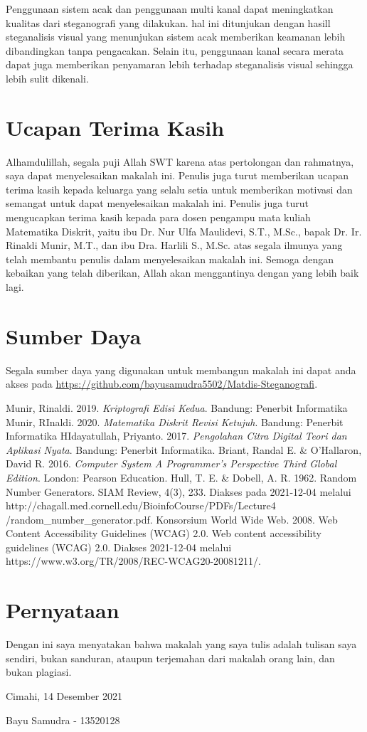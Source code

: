 \documentclass[10pt,conference]{IEEEtran}
\theoremstyle{definition}
\begin{document}
Penggunaan sistem acak dan penggunaan multi kanal dapat meningkatkan kualitas dari steganografi yang dilakukan. hal ini ditunjukan dengan hasill steganalisis visual yang menunjukan sistem acak memberikan keamanan lebih
dibandingkan tanpa pengacakan. Selain itu, penggunaan kanal secara merata dapat juga memberikan penyamaran lebih terhadap steganalisis visual sehingga lebih sulit dikenali.

\section*{Ucapan Terima Kasih}
Alhamdulillah, segala puji Allah SWT karena atas pertolongan dan rahmatnya, saya dapat menyelesaikan makalah ini. Penulis juga turut memberikan ucapan terima kasih kepada keluarga yang selalu setia untuk
memberikan motivasi dan semangat untuk dapat menyelesaikan makalah ini. Penulis juga turut mengucapkan terima kasih kepada para dosen pengampu mata kuliah Matematika Diskrit, yaitu ibu Dr. Nur Ulfa Maulidevi, S.T., M.Sc., bapak Dr. Ir.
Rinaldi Munir, M.T., dan ibu Dra. Harlili S., M.Sc. atas segala ilmunya yang telah membantu penulis dalam menyelesaikan makalah ini. Semoga dengan kebaikan yang telah diberikan, Allah akan menggantinya dengan yang lebih baik lagi.

\section*{Sumber Daya}
Segala sumber daya yang digunakan untuk membangun makalah ini dapat anda akses pada \url{https://github.com/bayusamudra5502/Matdis-Steganografi}.

\begin{thebibliography}{00}
 Munir, Rinaldi. 2019. \emph{Kriptografi Edisi Kedua}. Bandung: Penerbit Informatika 
 Munir, RInaldi. 2020. \emph{Matematika Diskrit Revisi Ketujuh}. Bandung: Penerbit Informatika
 HIdayatullah, Priyanto. 2017. \emph{Pengolahan Citra Digital Teori dan Aplikasi Nyata}. Bandung: Penerbit Informatika.
 Briant, Randal E. \& O'Hallaron, David R. 2016. \emph{Computer System A Programmer's Perspective Third Global Edition}. London: Pearson Education.
 Hull, T. E. \& Dobell, A. R. 1962. Random Number Generators. SIAM Review, 4(3), 233. Diakses pada 2021-12-04 melalui http://chagall.med.cornell.edu/BioinfoCourse/PDFs/Lecture4\\
/random\_number\_generator.pdf.
 Konsorsium World Wide Web. 2008. Web Content Accessibility Guidelines (WCAG) 2.0. Web content accessibility guidelines (WCAG) 2.0. Diakses 2021-12-04 melalui https://www.w3.org/TR/2008/REC-WCAG20-20081211/. 
\end{thebibliography}

\section*{Pernyataan}
Dengan ini saya menyatakan bahwa makalah yang saya tulis adalah tulisan saya sendiri, bukan sanduran, ataupun terjemahan dari makalah orang lain, dan bukan plagiasi.


\vspace{20px}
\hspace*{\fill} Cimahi, 14 Desember 2021

\vspace{30px}
\hspace*{\fill} Bayu Samudra - 13520128
\end{document}
